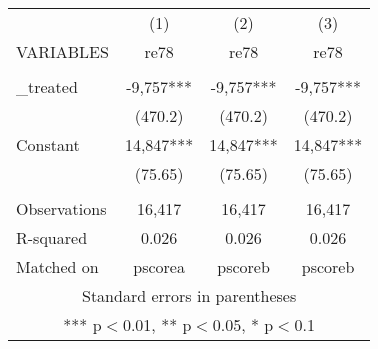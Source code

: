 \begin{tabular}{lccc} \hline
 & (1) & (2) & (3) \\
VARIABLES & re78 & re78 & re78 \\ \hline
 &  &  &  \\
\_treated & -9,757*** & -9,757*** & -9,757*** \\
 & (470.2) & (470.2) & (470.2) \\
Constant & 14,847*** & 14,847*** & 14,847*** \\
 & (75.65) & (75.65) & (75.65) \\
 &  &  &  \\
Observations & 16,417 & 16,417 & 16,417 \\
R-squared & 0.026 & 0.026 & 0.026 \\
 Matched on & pscorea & pscoreb & pscoreb \\ \hline
\multicolumn{4}{c}{ Standard errors in parentheses} \\
\multicolumn{4}{c}{ *** p$<$0.01, ** p$<$0.05, * p$<$0.1} \\
\end{tabular}
